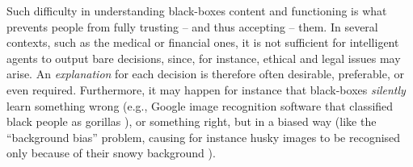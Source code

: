\documentclass[12pt,a4paper,openright,twoside]{book}
\begin{document}
Such difficulty in understanding black-boxes content and functioning is what prevents people from fully trusting -- and thus accepting -- them.
%
In several contexts, such as the medical or financial ones, it is not sufficient for intelligent agents to output bare decisions, since, for instance, ethical and legal issues may arise.
%
An \emph{explanation} for each decision is therefore often desirable, preferable, or even required.
%
Furthermore, it may happen for instance that black-boxes \emph{silently} learn something wrong (e.g., Google image recognition software that classified black people as gorillas \cite{fourcade2017, crawford2016artificial}), or something right, but in a biased way (like  the ``background bias'' problem, causing for instance husky images to be recognised only because of their snowy background \cite{RibeiroSG16}).


\end{document}
